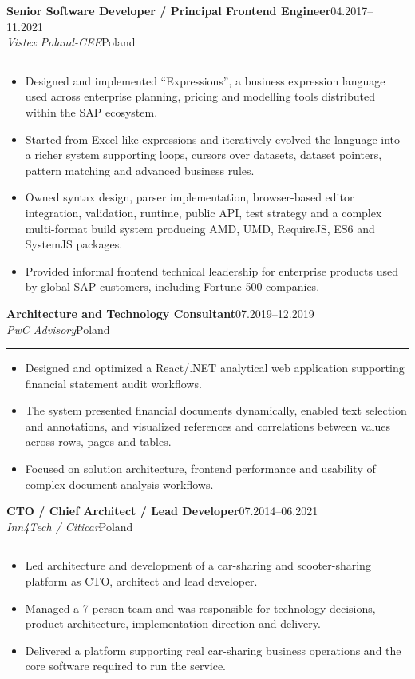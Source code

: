 \documentclass[10pt,a4paper]{article}
\newcommand{\role}[4]{%
  \Needspace{5\baselineskip}%
  \vspace{3pt}%
  {\bfseries\color{textmain}#1}\hfill {\small\color{textmuted}#2}\\[-1pt]
  {\itshape\color{accentdark}#3}\hfill {\small\color{textmuted}#4}\\[-4pt]
  {\color{linegray}\rule{\textwidth}{0.35pt}}\vspace{-3pt}
}
\begin{document}
\role{Senior Software Developer / Principal Frontend Engineer}{04.2017--11.2021}{Vistex Poland-CEE}{Poland}
\begin{itemize}
  \item Designed and implemented ``Expressions'', a business expression language used across enterprise planning, pricing and modelling tools distributed within the SAP ecosystem.
  \item Started from Excel-like expressions and iteratively evolved the language into a richer system supporting loops, cursors over datasets, dataset pointers, pattern matching and advanced business rules.
  \item Owned syntax design, parser implementation, browser-based editor integration, validation, runtime, public API, test strategy and a complex multi-format build system producing AMD, UMD, RequireJS, ES6 and SystemJS packages.
  \item Provided informal frontend technical leadership for enterprise products used by global SAP customers, including Fortune 500 companies.
\end{itemize}

\role{Architecture and Technology Consultant}{07.2019--12.2019}{PwC Advisory}{Poland}
\begin{itemize}
  \item Designed and optimized a React/.NET analytical web application supporting financial statement audit workflows.
  \item The system presented financial documents dynamically, enabled text selection and annotations, and visualized references and correlations between values across rows, pages and tables.
  \item Focused on solution architecture, frontend performance and usability of complex document-analysis workflows.
\end{itemize}

\role{CTO / Chief Architect / Lead Developer}{07.2014--06.2021}{Inn4Tech / Citicar}{Poland}
\begin{itemize}
  \item Led architecture and development of a car-sharing and scooter-sharing platform as CTO, architect and lead developer.
  \item Managed a 7-person team and was responsible for technology decisions, product architecture, implementation direction and delivery.
  \item Delivered a platform supporting real car-sharing business operations and the core software required to run the service.
\end{itemize}
\end{document}
